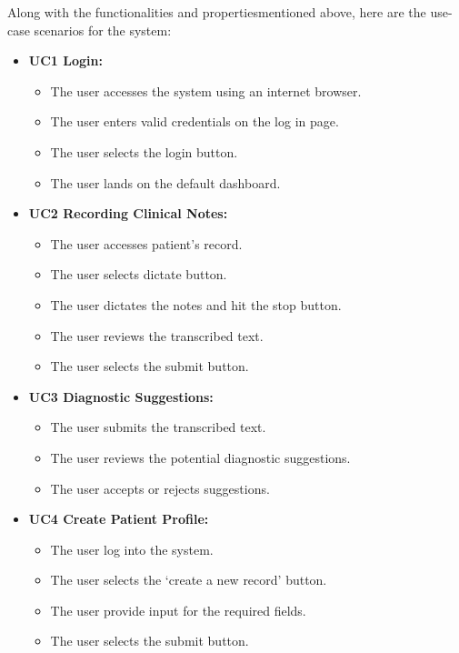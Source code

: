 \documentclass[12pt]{article}
\begin{document}
Along with the functionalities and propertiesmentioned above, here are the use-case scenarios for the system:

\begin{itemize}
  \item\textbf{UC1 Login:}
  \begin{itemize}
    \item The user accesses the system using an internet browser.
    \item The user enters valid credentials on the log in page.
    \item The user selects the login button.
    \item The user lands on the default dashboard.
  \end{itemize}
  \item\textbf{UC2 Recording Clinical Notes:}
  \begin{itemize}
    \item The user accesses patient’s record.
    \item The user selects dictate button.
    \item The user dictates the notes and hit the stop button.
    \item The user reviews the transcribed text.
    \item The user selects the submit button.
  \end{itemize}
  \item\textbf{UC3 Diagnostic Suggestions:}
  \begin{itemize}
    \item The user submits the transcribed text.
    \item The user reviews the potential diagnostic suggestions.
    \item The user accepts or rejects suggestions.
  \end{itemize}
  \item\textbf{UC4 Create Patient Profile:}
  \begin{itemize}
    \item The user log into the system.
    \item The user selects the ‘create a new record’ button.
    \item The user provide input for the required fields.    
    \item The user selects the submit button.
  \end{itemize}
\end{itemize}
\end{document}
